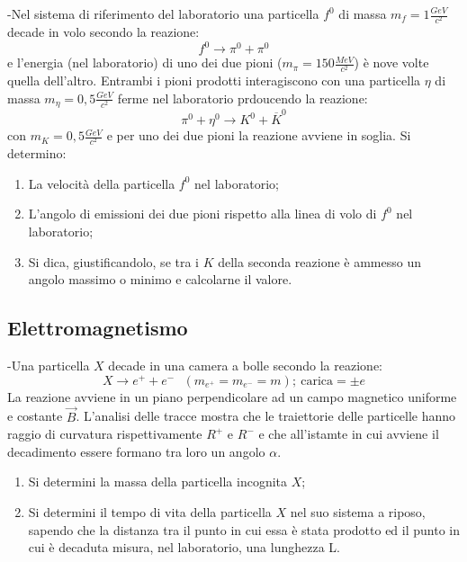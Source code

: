 \documentclass[12pt,twoside,a4]{article}
\begin{document}
\newpage
\begin{esercizio}
	-Nel sistema di riferimento del laboratorio una particella $f^0$ di massa $m_f= 1 \frac{GeV}{c^2}$ decade in volo secondo la reazione:
	\begin{equation*}
		f^0 \rightarrow \pi^0 + \pi^0
	\end{equation*}
	e l'energia (nel laboratorio) di uno dei due pioni ($m_\pi =150 \frac{MeV}{c^2}$) è nove volte quella dell'altro. Entrambi i pioni prodotti interagiscono con una particella $\eta$ di massa $m_\eta=0,5 \frac{GeV}{c^2}$ ferme nel laboratorio prdoucendo la reazione:
	\begin{equation*}
		\pi^0 + \eta^0 \rightarrow K^0 + \overline K^0
	\end{equation*}
	con $m_K=0,5 \frac{GeV}{c^2}$ e per uno dei due pioni la reazione avviene in soglia. Si determino:
	\begin{enumerate}[label=(\textit{\roman*})]
		\item La velocità  della particella $f^0$ nel laboratorio;
		\item L'angolo di emissioni dei due pioni rispetto alla linea di volo di $f^0$ nel laboratorio;
		\item Si dica, giustificandolo, se tra i $K$ della seconda reazione è ammesso un angolo massimo o minimo e calcolarne il valore.
	\end{enumerate}
\end{esercizio}

\newpage
{}
\subsection{Elettromagnetismo}
\begin{esercizio}
	-Una particella $X$ decade in una camera a bolle secondo la reazione:
	\begin{equation*}
		X \rightarrow e^++e^- \ \ \ (m_{e^+}=m_{e^-}=m); \ \text{carica}=\pm e
	\end{equation*}
	La reazione avviene in un piano perpendicolare ad un campo magnetico uniforme e costante $\vec B$. L'analisi delle tracce mostra che le traiettorie delle particelle hanno raggio di curvatura rispettivamente $R^+$ e $R^-$ e che all'istamte in cui avviene il decadimento essere formano tra loro un angolo $\alpha$.
	\begin{enumerate}[label=(\textit{\roman*})]
		\item Si determini la massa della particella incognita $X$;
		\item Si determini il tempo di vita della particella $X$ nel suo sistema a riposo, sapendo che la distanza tra il punto in cui essa è stata prodotto ed il punto in cui è decaduta misura, nel laboratorio, una lunghezza L.
	\end{enumerate}
\end{esercizio}
\end{document}
